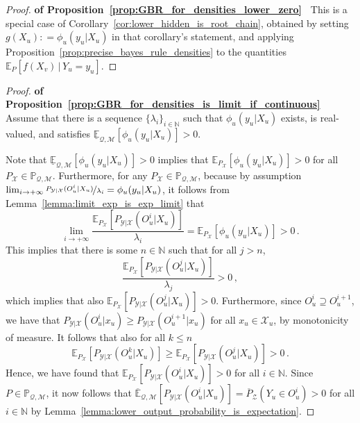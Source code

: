 \documentclass[twoside,11pt]{article}
\newcommand{\nats}{\mathbb{N}}
\newcommand{\states}{\mathcal{X}}
\newcommand{\observs}{\mathcal{Y}}
\newcommand{\lexp}{\underline{\mathbb{E}}_{\rateset,\mathcal{M}}}
\newcommand{\uexp}{\overline{\mathbb{E}}_{\rateset,\mathcal{M}}}
\newcommand{\rateset}{\mathcal{Q}}
\newcommand{\coloneqq}{:\!=}
\begin{document}
\begin{proof}{\bf of Proposition~\ref{prop:GBR_for_densities_lower_zero}~}
This is a special case of Corollary~\ref{cor:lower_hidden_is_root_chain}, obtained by setting $g(X_u)\coloneqq \phi_u(y_u\vert X_u)$ in that corollary's statement, and applying Proposition~\ref{prop:precise_bayes_rule_densities} to the quantities $\mathbb{E}_P[f(X_v)\,\vert\,Y_u=y_u]$.
\end{proof}


\begin{proof}{\bf of Proposition~\ref{prop:GBR_for_densities_is_limit_if_continuous}~}
Assume that there is a sequence $\{\lambda_i\}_{i\in\nats}$ such that $\phi_u(y_u\vert X_u)$ exists, is real-valued, and satisfies $\lexp[\phi_u(y_u\vert X_u)] >0$. 

Note that $\lexp[\phi_u(y_u\vert X_u)] >0$ implies that $\mathbb{E}_{P_\states}[\phi_u(y_u\vert X_u)]>0$ for all $P_\states\in\mathbb{P}_{\rateset,\mathcal{M}}$. Furthermore, for any $P_\states\in\mathbb{P}_{\rateset,\mathcal{M}}$, because by assumption $\lim_{i\to+\infty}\nicefrac{P_{\observs\vert\states}(O_u^i\vert X_u)}{\lambda_i}=\phi_u(y_u\vert X_u)$, it follows from Lemma~\ref{lemma:limit_exp_is_exp_limit} that
\begin{equation*}
\lim_{i\to+\infty}\frac{\mathbb{E}_{P_\states}[P_{\observs\vert\states}(O_u^i\vert X_u)]}{\lambda_i} = \mathbb{E}_{P_\states}[\phi_u(y_u\vert X_u)] > 0\,.
\end{equation*}
This implies that there is some $n\in\nats$ such that for all $j>n$,
\begin{equation*}
\frac{\mathbb{E}_{P_\states}[P_{\observs\vert\states}(O_u^j\vert X_u)]}{\lambda_j} > 0\,,
\end{equation*}
which implies that also $\mathbb{E}_{P_\states}[P_{\observs\vert\states}(O_u^j\vert X_u)] >0$. Furthermore, since $O_u^i\supseteq O_u^{i+1}$, we have that $P_{\observs\vert\states}(O_u^i\vert x_u)\geq P_{\observs\vert\states}(O_u^{i+1}\vert x_u)$ for all $x_u\in\states_u$, by monotonicity of measure. It follows that also for all $k\leq n$
\begin{equation*}
\mathbb{E}_{P_\states}[P_{\observs\vert\states}(O_u^k\vert X_u)] \geq \mathbb{E}_{P_\states}[P_{\observs\vert\states}(O_u^j\vert X_u)] > 0\,.
\end{equation*}
Hence, we have found that $\mathbb{E}_{P_\states}[P_{\observs\vert\states}(O_u^i\vert X_u)]>0$ for all $i\in\nats$. Since $P\in\mathbb{P}_{\rateset,\mathcal{M}}$, it now follows that $\uexp[P_{\observs\vert\states}(O_u^i\vert X_u)]=\overline{P}_{\mathcal{Z}}(Y_u\in O_u^i)>0$ for all $i\in\nats$ by Lemma~\ref{lemma:lower_output_probability_is_expectation}.


\end{proof}
\end{document}
